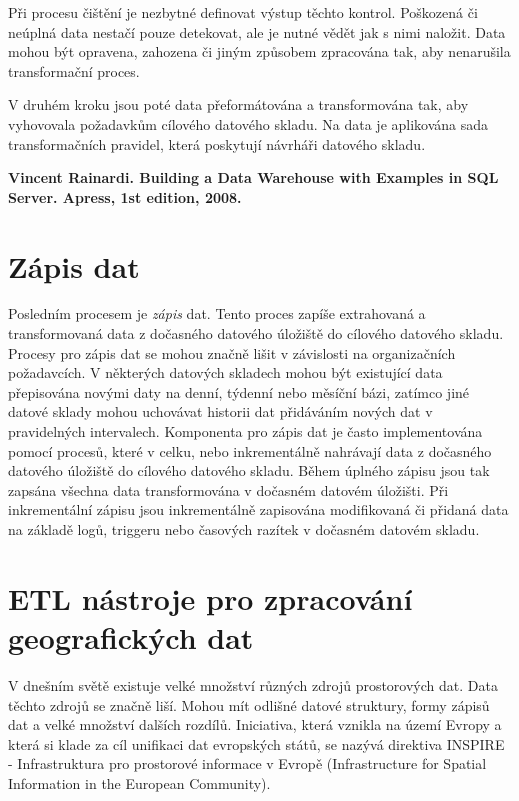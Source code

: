 Při procesu čištění je nezbytné definovat výstup těchto kontrol. Poškozená či neúplná data nestačí pouze detekovat, ale je nutné vědět jak s nimi naložit. Data mohou být opravena, zahozena či jiným způsobem zpracována tak, aby nenarušila transformační proces. 

V druhém kroku jsou poté data přeformátována a transformována tak, aby vyhovovala požadavkům cílového datového skladu. Na data je aplikována sada transformačních pravidel, která poskytují návrháři datového skladu. 

\textbf{Vincent Rainardi. Building a Data Warehouse with Examples in SQL Server. Apress, 1st edition, 2008.}

\section{Zápis dat}

Posledním procesem je \textit{zápis} dat. Tento proces zapíše extrahovaná a transformovaná data z dočasného datového úložiště do cílového datového skladu. Procesy pro zápis dat se mohou značně lišit v závislosti na organizačních požadavcích. V některých datových skladech mohou být existující data přepisována novými daty na denní, týdenní nebo měsíční bázi, zatímco jiné datové sklady mohou uchovávat historii dat přidáváním nových dat v pravidelných intervalech. Komponenta pro zápis dat je často implementována pomocí procesů, které v celku, nebo inkrementálně nahrávají data z dočasného datového úložiště do cílového datového skladu. Během úplného zápisu jsou tak zapsána všechna data transformována v dočasném datovém úložišti. Při inkrementální zápisu jsou inkrementálně zapisována modifikovaná či přidaná data na základě logů, triggeru nebo časových razítek v dočasném datovém skladu. 

\section{ETL nástroje pro zpracování geografických dat}

V dnešním světě existuje velké množství různých zdrojů prostorových dat. Data těchto zdrojů se značně liší. Mohou mít odlišné datové struktury, formy zápisů dat a velké množství dalších rozdílů. Iniciativa, která vznikla na území Evropy a která si klade za cíl unifikaci dat evropských států, se nazývá direktiva INSPIRE - Infrastruktura pro prostorové informace v Evropě (Infrastructure  for  Spatial  Information  in  the  European Community). 

